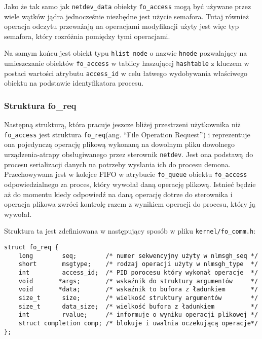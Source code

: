 \documentclass[10pt]{article}
\begin{document}
Jako że tak samo jak \texttt{netdev\_data} obiekty \texttt{fo\_access} mogą być używane przez wiele wątków jądra jednocześnie niezbędne jest użycie semafora. Tutaj również operacja odczytu przeważają na operacjami modyfikacji użyty jest więc typ semafora, który rozróżnia pomiędzy tymi operacjami.

Na samym końcu jest obiekt typu \texttt{hlist\_node} o nazwie \texttt{hnode} pozwalający na umieszczanie obiektów \texttt{fo\_access} w tablicy haszującej \texttt{hashtable} z kluczem w postaci wartości atrybutu \texttt{access\_id} w celu łatwego wydobywania właściwego obiektu na podstawie identyfikatora procesu.

\subsubsection{Struktura fo\_req}

Następną strukturą, która pracuje jeszcze bliżej przestrzeni użytkownika niż \texttt{fo\_access} jest struktura \texttt{fo\_req}(ang. ``File Operation Request'') i reprezentuje ona pojedynczą operację plikową wykonaną na dowolnym pliku dowolnego urządzenia-atrapy obsługiwanego przez sterownik \texttt{netdev}. Jest ona podstawą do procesu serializacji danych na potrzeby wysłania ich do procesu demona.  Przechowywana jest w kolejce FIFO w atrybucie \texttt{fo\_queue} obiektu \texttt{fo\_access} odpowiedzialnego za proces, który wywołał daną operację plikową. Istnieć będzie aż do momentu kiedy odpowiedź na daną operację dotrze do sterownika i operacja plikowa zwróci kontrolę razem z wynikiem operacji do procesu, który ją wywołał.

Struktura ta jest zdefiniowana w następujący sposób w pliku \texttt{kernel/fo\_comm.h}:

\begin{verbatim}
struct fo_req {
    long        seq;        /* numer sekwencyjny użyty w nlmsgh_seq */
    short       msgtype;    /* rodzaj operacji użyty w nlmsgh_type  */
    int         access_id;  /* PID porocesu który wykonał operacje  */
    void       *args;       /* wskaźnik do struktury argumentów     */
    void       *data;       /* wskaźnik to bufora z ładunkiem       */
    size_t      size;       /* wielkość struktury argumentów        */
    size_t      data_size;  /* wielkość bufora z ładunkiem          */
    int         rvalue;     /* informuje o wyniku operacji plikowej */
    struct completion comp; /* blokuje i uwalnia oczekującą operacje*/
};
\end{verbatim}
\end{document}
